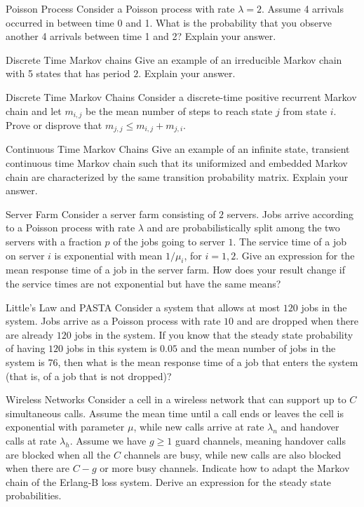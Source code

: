 \begin{problem}{Poisson Process}
 Consider a Poisson process with rate $\lambda =2$. Assume 4 arrivals occurred in between time 0 and 1. What is the probability that you observe another 4 arrivals between time 1 and 2? Explain your answer.
\end{problem}

\begin{problem}{Discrete Time Markov chains}
Give an example of an irreducible Markov chain
with 5 states that has period $2$. Explain your answer.
\end{problem}

\begin{problem}{Discrete Time Markov Chains}
Consider a discrete-time positive recurrent Markov chain and let $m_{i,j}$ be the mean number of steps to reach state $j$ from state $i$. Prove or disprove that $m_{j,j} \leq m_{i,j} + m_{j,i}$.
\end{problem}

\begin{problem}{Continuous Time Markov Chains}
Give an example of an infinite state, transient continuous time Markov chain such that its uniformized and embedded Markov chain are characterized by the same transition probability matrix. Explain your answer.
\end{problem}

\begin{problem}{Server Farm}
Consider a server farm consisting of $2$ servers. Jobs arrive according to a Poisson process with rate $\lambda$ and are probabilistically split among the two servers with a fraction $p$ of the jobs going to server $1$. The service time of a job on server $i$ is exponential with mean $1/\mu_i$, for $i = 1, 2$. Give an expression for the mean response time of a job in the server farm. How does your result change if the service times are
not exponential but have the same means?
\end{problem}

\begin{problem}{Little's Law and PASTA}
Consider a system that allows at most $120$ jobs in the system. Jobs arrive as a Poisson process with rate $10$ and are dropped when there are already $120$ jobs in the system. If you know that the steady state probability of having $120$ jobs in this system is $0.05$ and the mean number of jobs in the system is $76$, then what is the mean response time of a job that enters the system (that is, of a job that is not dropped)?
\end{problem}

\begin{problem}{Wireless Networks}
Consider a cell in a wireless network that can support up to $C$ simultaneous calls. Assume the mean time until a call ends or leaves the cell is exponential with parameter $\mu$, while new calls arrive at rate $\lambda_n$ and handover calls at rate $\lambda_h$. Assume we have $g \geq 1$ guard channels, meaning handover calls are blocked when all the $C$ channels are busy, while new calls are also blocked when there are $C - g$ or more busy channels. Indicate how to adapt the Markov chain of the Erlang-B loss system. Derive an expression for the steady state probabilities.
\end{problem}
